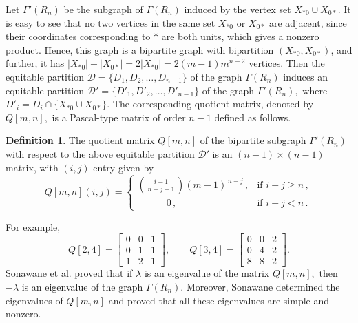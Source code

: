 \documentclass[11pt,oneside]{article}
\theoremstyle{plain}
\theoremstyle{plain}
\theoremstyle{definition}
\newtheorem{defi}[theorem]{Definition}
\numberwithin{figure}{section}
\theoremstyle{remark}
\numberwithin{equation}{section}
\begin{document}
		Let $\Gamma'(R_n)$ be the subgraph of $\Gamma(R_n)$ induced by the vertex set $X_{*0} \cup X_{0*}$. It is easy to see that no two vertices in the same set $X_{*0}$ or $X_{0*}$ are adjacent, since their coordinates corresponding to $*$ are both units, which gives a nonzero product. Hence, this graph is a bipartite graph with bipartition $(X_{*0}, X_{0*})$, and further, it has
		$
		|X_{*0}| + |X_{0*}| = 2|X_{*0}| = 2(m-1)m^{n-2}$ vertices.  
		Then the equitable partition $\mathcal{D} = \{D_1, D_2, \dots, D_{n-1} \}$ of the graph $\Gamma(R_n)$ induces an equitable partition $\mathcal{D'} = \{D'_1, D'_2, \dots, D'_{n-1}\}$ of the graph $\Gamma'(R_n),$ where  $D'_i = D_i \cap \{X_{*0} \cup X_{0*}\}.$  The corresponding quotient matrix, denoted by $Q[m,n],$ is a Pascal-type matrix of order $n-1$ defined as follows.
		\begin{defi}\cite{sonawane1}
			The quotient matrix $Q[m,n]$ of the bipartite subgraph $\Gamma'(R_n)$ with respect to the above equitable partition $\mathcal{D'}$ is an $(n-1) \times (n-1)$ matrix, with $(i,j)$-entry given by
			\[
			Q[m,n](i,j) =
			\begin{cases}
				\displaystyle \binom{i-1}{\,n-j-1\,}(m-1)^{\,n-j}\,, & \text{if } i + j \geq n\,, \\[6pt]
				\quad \quad \quad 0\,, & \text{if } i + j < n\,.
			\end{cases}
			\]
		\end{defi}
		
		For example, 
		\[
		Q[2,4] =
		\begin{bmatrix}
			0 & 0 & 1 \\
			0 & 1 & 1 \\
			1 & 2 & 1
		\end{bmatrix},
		\qquad
		Q[3,4] =
		\begin{bmatrix}
			0 & 0 & 2 \\
			0 & 4 & 2 \\
			8 & 8 & 2
		\end{bmatrix}.
		\]
		Sonawane et al. \cite{sonawane1} proved that if $\lambda$ is an eigenvalue of the matrix $Q[m,n],$ then $-\lambda$ is an eigenvalue of the graph $\Gamma(R_n).$ Moreover, Sonawane \cite{sonawane2} determined the eigenvalues of $Q[m,n]$ and proved that all these eigenvalues are simple and nonzero. 
		
		
		
\end{document}
